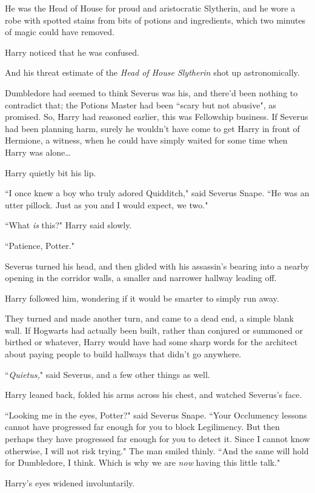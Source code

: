 He was the Head of House for proud and aristocratic Slytherin, and he wore a robe with spotted stains from bits of potions and ingredients, which two minutes of magic could have removed.

Harry noticed that he was confused.

And his threat estimate of the \emph{Head of House Slytherin} shot up astronomically.

Dumbledore had seemed to think Severus was his, and there'd been nothing to contradict that; the Potions Master had been ``scary but not abusive", as promised. So, Harry had reasoned earlier, this was Fellowship business. If Severus had been planning harm, surely he wouldn't have come to get Harry in front of Hermione, a witness, when he could have simply waited for some time when Harry was alone{\ldots}

Harry quietly bit his lip.

``I once knew a boy who truly adored Quidditch," said Severus Snape. ``He was an utter pillock. Just as you and I would expect, we two."

``What \emph{is} this?" Harry said slowly.

``Patience, Potter."

Severus turned his head, and then glided with his assassin's bearing into a nearby opening in the corridor walls, a smaller and narrower hallway leading off.

Harry followed him, wondering if it would be smarter to simply run away.

They turned and made another turn, and came to a dead end, a simple blank wall. If Hogwarts had actually been built, rather than conjured or summoned or birthed or whatever, Harry would have had some sharp words for the architect about paying people to build hallways that didn't go anywhere.

``\emph{Quietus,}" said Severus, and a few other things as well.

Harry leaned back, folded his arms across his chest, and watched Severus's face.

``Looking me in the eyes, Potter?" said Severus Snape. ``Your Occlumency lessons cannot have progressed far enough for you to block Legilimency. But then perhaps they have progressed far enough for you to detect it. Since I cannot know otherwise, I will not risk trying." The man smiled thinly. ``And the same will hold for Dumbledore, I think. Which is why we are \emph{now} having this little talk."

Harry's eyes widened involuntarily.

